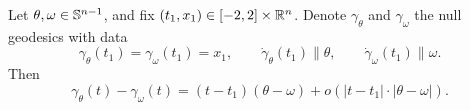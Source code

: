 \begin{proposition}
    Let $\theta, \omega \in \mathbb S^{n - 1}$, and fix $(t_1, x_1) \in [-2, 2] \times \mathbb R^n$. Denote $\gamma_\theta$ and $\gamma_\omega$ the null geodesics with data 
        \[
            \gamma_\theta(t_1) = \gamma_\omega(t_1) = x_1, \qquad \dot \gamma_\theta(t_1) \parallel \theta, \qquad \dot \gamma_\omega(t_1) \parallel \omega.
        \]
    Then 
        \begin{equation}
            \gamma_\theta (t) - \gamma_\omega(t) 
                = (t - t_1) (\theta - \omega) + o(|t - t_1| \cdot |\theta - \omega|).
        \end{equation}
\end{proposition}